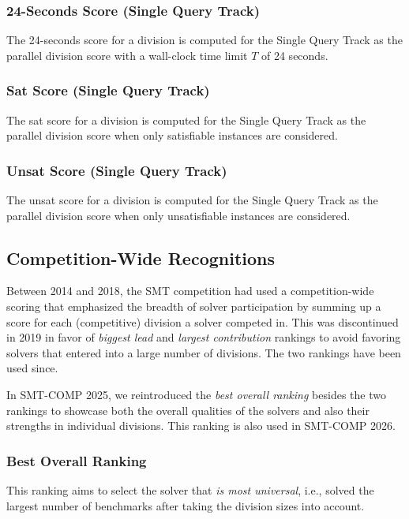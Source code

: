 \documentclass[12pt]{article}
\newcommand{\maintrack}{Single Query Track\xspace}
\begin{document}
\subsubsection{24-Seconds Score (\maintrack)}

The 24-seconds score for a division is computed for the \maintrack as the
parallel division score with a wall-clock time limit $T$ of 24 seconds.

\subsubsection{Sat Score (\maintrack)}

The sat score for a division is computed for the \maintrack as the
parallel division score when only satisfiable instances are considered.

\subsubsection{Unsat Score (\maintrack)}
The unsat score for a division is computed for the \maintrack as the
parallel division score when only unsatisfiable instances are considered.

\subsection{Competition-Wide Recognitions}

Between 2014 and 2018, the SMT competition had used a competition-wide scoring
that emphasized the breadth of solver participation by summing up a score for
each (competitive) division a solver competed in. This was discontinued in 2019
in favor of \emph{biggest lead} and \emph{largest contribution} rankings
to avoid favoring solvers that entered into a large number of divisions. The two
rankings have been used since.

In SMT-COMP 2025, we reintroduced the \emph{best overall ranking} besides the
two rankings to showcase both the overall qualities of the solvers and also
their strengths in individual divisions. This ranking is also used in SMT-COMP
2026.

\subsubsection{Best Overall Ranking}
This ranking aims to select the solver that \emph{is most universal}, i.e.,
solved the largest number of benchmarks after taking the division sizes into
account.
\end{document}
